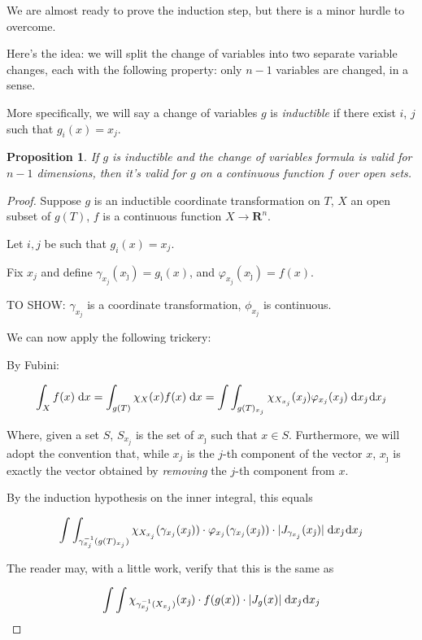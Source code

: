 \documentclass[11pt]{article}
\theoremstyle{definition}
\theoremstyle{plain}
\newtheorem{prop}{Proposition}
\newcommand{\R}{\mathbf{R}}
\newcommand{\mo}{^{-1}}
\begin{document}
We are almost ready to prove the induction step, but there is a minor hurdle to overcome.

Here's the idea: we will split the change of variables into two separate variable changes, each with the following property: only $n-1$ variables are changed, in a sense. %

More specifically, we will say a change of variables $g$ is \emph{inductible} if there exist $i$, $j$ such that $g_i(x) = x_j$.

\begin{prop}
If $g$ is inductible and the change of variables formula is valid for $n-1$ dimensions, then it's valid for $g$ on a continuous function $f$ over open sets.
\end{prop}

\begin{proof}
Suppose $g$ is an inductible coordinate transformation on $T$, $X$ an open subset of $g(T)$, $f$ is a continuous function $X \rightarrow \R^n$.

Let $i, j$ be such that $g_i(x) = x_j$.

Fix $x_j$ and define $\gamma_{x_j}(x_{\hat\jmath}) = g_{\hat\imath}(x)$,  and $\varphi_{x_j}(x_{\hat\jmath}) = f(x)$.

TO SHOW: $\gamma_{x_j}$ is a coordinate transformation, $\phi_{x_j}$ is continuous.

We can now apply the following trickery:

By Fubini:

\[\int_X f(x) \d x = \int_{g(T)} \chi_X(x) f(x) \d x = \int \int_{g(T)_{x_j}} \chi_{X_{x_j}}(x_{\hat\jmath}) \varphi_{x_j}(x_{\hat\jmath}) \d{x_{\hat\jmath}} \d{x_j}\]

Where, given a set $S$, $S_{x_j}$ is the set of $x_{\hat\jmath}$ such that $x \in S$. Furthermore, we will adopt the convention that, while $x_j$ is the $j$-th component of the vector $x$, $x_{\hat\jmath}$ is exactly the vector obtained by \emph{removing} the $j$-th component from $x$.

By the induction hypothesis on the inner integral, this equals

\[ \int \int_{\gamma_{x_j}\mo(g(T)_{x_j})} \chi_{X_{x_j}}(\gamma_{x_j}(x_{\hat\jmath})) \cdot \varphi_{x_j}(\gamma_{x_j}(x_{\hat\jmath})) \cdot \lvert J_{\gamma_{x_j}}(x_{\hat\jmath}) \rvert \d{x_{\hat\jmath}} \d{x_j} \]

The reader may, with a little work, verify that this is the same as

\[ \int \int \chi_{\gamma_{x_j}\mo(X_{x_j})}(x_{\hat\jmath}) \cdot f(g(x)) \cdot \lvert J_g(x) \rvert \d{x_{\hat\jmath}} \d{x_j}  \]


\end{proof}
\end{document}
